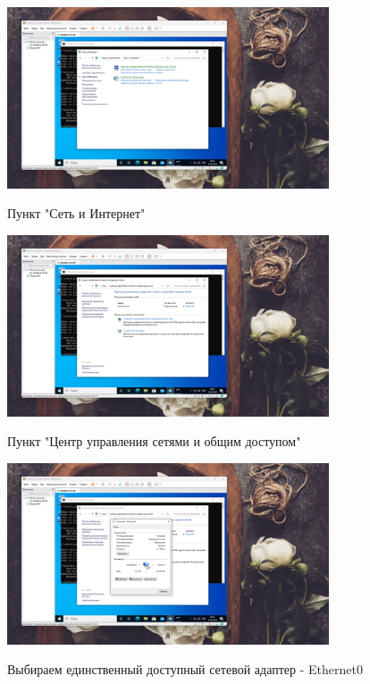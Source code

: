 \documentclass[a4paper]{article}
\begin{document}
  \begin{figure}[H]
    \centering
    \includegraphics[width=0.85\textwidth]{06_00 (20)}
    \label{img:20}
    \caption{Пункт "Сеть и Интернет"}
  \end{figure}
  
  \begin{figure}[H]
    \centering
    \includegraphics[width=0.85\textwidth]{06_00 (21)}
    \label{img:21}
    \caption{Пункт "Центр управления сетями и общим доступом"}
  \end{figure}
  
  \begin{figure}[H]
    \centering
    \includegraphics[width=0.85\textwidth]{06_00 (22)}
    \label{img:22}
    \caption{Выбираем единственный доступный сетевой адаптер - Ethernet0}
  \end{figure}
  
\end{document}
